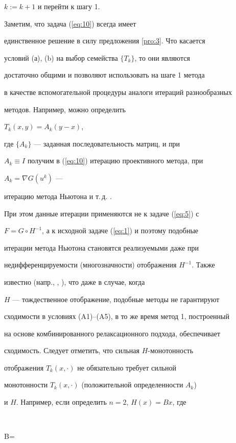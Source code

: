 $k:=k+1$ и перейти к шагу 1.


\medskip





Заметим, что задача (\ref{eq:10}) всегда имеет 


единственное решение в силу предложения \ref{pro:3}. Что касается 


условий (а), (b) на выбор семейства $\{ T_{k} \}$, то они являются 


достаточно общими и позволяют использовать на шаге 1 метода 


в качестве вспомогательной процедуры аналоги итераций разнообразных 


методов. Например, можно определить


$T_{k}(x,y)=A_{k}(y-x)$,


где $\{ A_{k} \}$ --- заданная последовательность матриц, и при 


$A_{k} \equiv I$ получим в (\ref{eq:10}) итерацию проективного метода, при 


$A_{k}=\nabla G(u^{k})$ ---


итерацию метода Ньютона и т.\,д. \cite{Kon01}. 


При этом данные итерации применяются не к задаче (\ref{eq:5}) с 


$F=G \circ H^{-1}$, а к исходной задаче (\ref{eq:1}) и поэтому подобные 


итерации метода Ньютона становятся реализуемыми даже при 


недифференцируемости (многозначности) отображения $H^{-1}$. Также 


известно (напр., \cite{Kon98}, \cite{Kon01}), что даже в случае, когда 


$H$ --- тождественное отображение, подобные методы не гарантируют 


сходимости в условиях (A1)--(A5), в то же время метод 1, построенный 


на основе комбинированного релаксационного подхода, обеспечивает 


сходимость. Следует отметить, что сильная $H$-монотонность 


отображения $T_{k}(x,\cdot)$ не обязательно требует сильной 


монотонности $T_{k}(x,\cdot)$ (положительной определенности $A_{k}$)


и $H$. Например, если определить $n=2$, $H(x)=Bx$, где 


$$


B=


